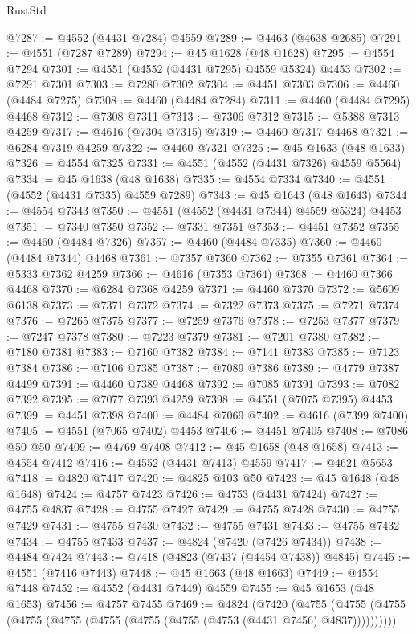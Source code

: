 \begin{lexlean}{RustStd}
\begin{coremodule}
@7287 := @4552 (@4431 @7284) @4559
@7289 := @4463 (@4638 @2685)
@7291 := @4551 (@7287 @7289)
@7294 := @45 @1628 (@48 @1628)
@7295 := @4554 @7294
@7301 := @4551 (@4552 (@4431 @7295) @4559 @5324) @4453
@7302 := @7291 @7301
@7303 := @7280 @7302
@7304 := @4451 @7303
@7306 := @4460 (@4484 @7275)
@7308 := @4460 (@4484 @7284)
@7311 := @4460 (@4484 @7295) @4468
@7312 := @7308 @7311
@7313 := @7306 @7312
@7315 := @5388 @7313 @4259
@7317 := @4616 (@7304 @7315)
@7319 := @4460 @7317 @4468
@7321 := @6284 @7319 @4259
@7322 := @4460 @7321
@7325 := @45 @1633 (@48 @1633)
@7326 := @4554 @7325
@7331 := @4551 (@4552 (@4431 @7326) @4559 @5564)
@7334 := @45 @1638 (@48 @1638)
@7335 := @4554 @7334
@7340 := @4551 (@4552 (@4431 @7335) @4559 @7289)
@7343 := @45 @1643 (@48 @1643)
@7344 := @4554 @7343
@7350 := @4551 (@4552 (@4431 @7344) @4559 @5324) @4453
@7351 := @7340 @7350
@7352 := @7331 @7351
@7353 := @4451 @7352
@7355 := @4460 (@4484 @7326)
@7357 := @4460 (@4484 @7335)
@7360 := @4460 (@4484 @7344) @4468
@7361 := @7357 @7360
@7362 := @7355 @7361
@7364 := @5333 @7362 @4259
@7366 := @4616 (@7353 @7364)
@7368 := @4460 @7366 @4468
@7370 := @6284 @7368 @4259
@7371 := @4460 @7370
@7372 := @5609 @6138
@7373 := @7371 @7372
@7374 := @7322 @7373
@7375 := @7271 @7374
@7376 := @7265 @7375
@7377 := @7259 @7376
@7378 := @7253 @7377
@7379 := @7247 @7378
@7380 := @7223 @7379
@7381 := @7201 @7380
@7382 := @7180 @7381
@7383 := @7160 @7382
@7384 := @7141 @7383
@7385 := @7123 @7384
@7386 := @7106 @7385
@7387 := @7089 @7386
@7389 := @4779 @7387 @4499
@7391 := @4460 @7389 @4468
@7392 := @7085 @7391
@7393 := @7082 @7392
@7395 := @7077 @7393 @4259
@7398 := @4551 (@7075 @7395) @4453
@7399 := @4451 @7398
@7400 := @4484 @7069
@7402 := @4616 (@7399 @7400)
@7405 := @4551 (@7065 @7402) @4453
@7406 := @4451 @7405
@7408 := @7086 @50 @50
@7409 := @4769 @7408
@7412 := @45 @1658 (@48 @1658)
@7413 := @4554 @7412
@7416 := @4552 (@4431 @7413) @4559
@7417 := @4621 @5653
@7418 := @4820 @7417
@7420 := @4825 @103 @50
@7423 := @45 @1648 (@48 @1648)
@7424 := @4757 @7423
@7426 := @4753 (@4431 @7424)
@7427 := @4755 @4837
@7428 := @4755 @7427
@7429 := @4755 @7428
@7430 := @4755 @7429
@7431 := @4755 @7430
@7432 := @4755 @7431
@7433 := @4755 @7432
@7434 := @4755 @7433
@7437 := @4824 (@7420 (@7426 @7434))
@7438 := @4484 @7424
@7443 := @7418 (@4823 (@7437 (@4454 @7438)) @4845)
@7445 := @4551 (@7416 @7443)
@7448 := @45 @1663 (@48 @1663)
@7449 := @4554 @7448
@7452 := @4552 (@4431 @7449) @4559
@7455 := @45 @1653 (@48 @1653)
@7456 := @4757 @7455
@7469 := @4824
    (@7420
      (@4755 (@4755 (@4755 (@4755 (@4755 (@4755 (@4755 (@4755 (@4753 (@4431 @7456) @4837))))))))))

\end{coremodule}
\end{lexlean}
